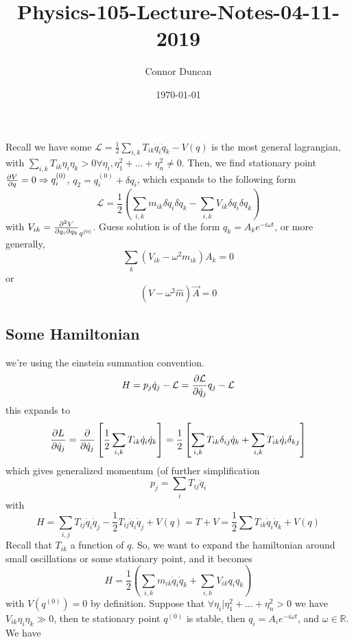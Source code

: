 \documentclass{article} \usepackage{amsmath} \usepackage{amssymb} \usepackage{amsthm} \usepackage[margin=0.2in]{geometry} \usepackage{hyperref} \usepackage{physics} \usepackage{tikz}\usetikzlibrary{decorations.pathmorphing} \usepackage{mathtools} \mathtoolsset{showonlyrefs} \theoremstyle{definition} \newtheorem{theorem}{Theorem}[section] \newtheorem{corollary}{Corollary}[theorem] \newtheorem{lemma}[theorem]{Lemma} \newtheorem{definition}{Definition}[section] \author{Connor Duncan} \date{\today}
\title{Physics-105-Lecture-Notes-04-11-2019}
\begin{document}
\maketitle\tableofcontents
\noindent{}
Recall we have some $\mathcal L=\frac{1}{2}\sum_{i,k}T_{ik}\dot q_i\dot q_k-V(q)$ is the most general lagrangian, with $\sum_{i,k}T_{ik}\eta_i\eta_k>0\forall\eta_i,\eta_1^2+\ldots+\eta_n^2\neq 0$. Then, we find stationary point $\pdv{V}{q}=0\Rightarrow q_i^{(0)}$, $q_2=q_i^{(0)}+\delta q_i$, which expands to the following form \begin{equation} \mathcal L=\frac{1}{2}\left( \sum_{i,k}m_{ik}\delta\dot q_i\delta\dot q_k - \sum_{i,k}V_{ik}\delta q_i\delta q_k \right) \end{equation} with $V_{ik}=\pdv[2]{V}{q_i}{q_k}_{q^{(0)}}$. Guess solution is of the form $q_k=A_ke^{-i\omega t}$, or more generally, \begin{equation} \sum_k(V_{ik}-\omega^2m_{ik})A_k=0 \end{equation} or \begin{equation} (\hat V-\omega^2\hat m)\vec{A}=0 \end{equation} \subsection{Some Hamiltonian} we're using the einstein summation convention. \begin{equation} H=p_j\dot q_j-\mathcal L=\pdv{\mathcal L}{\dot q_j}q_j-\mathcal L \end{equation} this expands to \begin{align} \pdv{L}{\dot q_j}=\pdv{\dot q_j}\left[ \frac{1}{2}\sum_{i,k}T_{ik}\dot q_i\dot q_k \right] = \frac{1}{2}\left[ \sum_{i,k}T_{ik}\delta_{ij}\dot q_k+\sum_{i,k}T_{ik}\dot q_i\delta_{kj} \right] \end{align} which gives generalized momentum (of further simplification \begin{equation} p_j=\sum_iT_{ij}\dot q_i \end{equation} with \begin{equation} H=\sum_{i,j}T_{ij}\dot q_i\dot q_j-\frac{1}{2}T_{ij}\dot q_i\dot q_j+V(q)=T+V=\frac{1}{2}\sum T_{ik}\dot q_i\dot q_k+V(q) \end{equation} Recall that $T_{ik}$ a function of $q$. So, we want to expand the hamiltonian around small oscillations or some stationary point, and it becomes \begin{equation} H=\frac{1}{2}\left( \sum_{i,k}m_{ik}\dot q_i\dot q_k+\sum_{i,k}V_{ik}q_iq_k \right) \end{equation} with $V(q^{(0)})=0$ by definition. \theorem Suppose that $\forall\eta_i|\eta_1^2+\ldots+\eta_n^2>0$ we have $V_{ik}\eta_i\eta_k\gg 0$, then te stationary point $q^{(0)}$ is stable, then $q_i=A_ie^{-i\omega t}$, and $\omega\in\mathbb{R}$. \proof We have 
\end{document}

